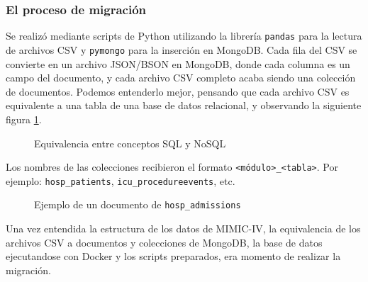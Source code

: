 \subsubsection{El proceso de migración}

Se realizó mediante scripts de Python utilizando la librería \texttt{pandas} para la lectura de archivos CSV y \texttt{pymongo} para la inserción en MongoDB. Cada fila del CSV se convierte en un archivo JSON/BSON \cite{mongojsonbson} en MongoDB, donde cada columna es un campo del documento, y cada archivo CSV completo acaba siendo una colección de documentos. Podemos entenderlo mejor, pensando que cada archivo CSV es equivalente a una tabla de una base de datos relacional, y observando la siguiente figura \ref{fig:equivalenciasql}.

\begin{figure}[H]
  \centering
  \caption{Equivalencia entre conceptos SQL y NoSQL \cite{equisqlfoto}}
  \label{fig:equivalenciasql}
\end{figure}

Los nombres de las colecciones recibieron el formato \texttt{\textless módulo\textgreater\_\textless tabla\textgreater}. Por ejemplo: \texttt{hosp\_patients}, \texttt{icu\_procedureevents}, etc.

\begin{figure}[H]
  \centering
  \caption{Ejemplo de un documento de \texttt{hosp\_admissions}}
  \label{fig:screenshot3}
\end{figure}

Una vez entendida la estructura de los datos de MIMIC-IV, la equivalencia de los archivos CSV a documentos y colecciones de MongoDB, la base de datos ejecutandose con Docker y los scripts preparados, era momento de realizar la migración. 


